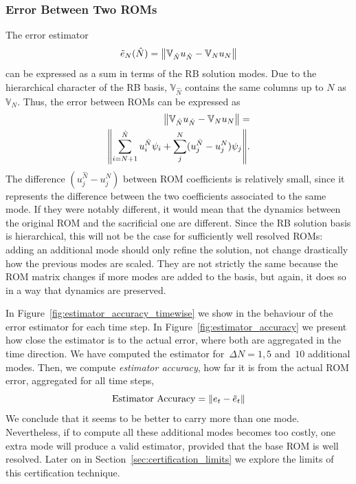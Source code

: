 \documentclass[../../thesis.tex]{subfiles}
\newcommand{\rbV}{\ensuremath{\mathbb{V}}}
\begin{document}
\subsubsection{Error Between Two ROMs}
The error estimator 
\begin{equation}
    \tilde{e}_{N}(\hat{N}) = \norm{\rbV_{\hat{N}} u_{\hat{N}} - \rbV_{N} u_{N}}
\end{equation}
can be expressed as a sum in terms of the RB solution modes.
Due to the hierarchical character of the RB basis, 
$\rbV_{\hat{N}}$ contains the same columns 
up to $N$ as $\rbV_{N}$.
Thus, the error between ROMs can be expressed as
\begin{equation}
    \begin{split}
        \norm{\rbV_{\hat{N}} u_{\hat{N}} - \rbV_{N} u_{N}} 
        = \\ 
        \norm{
        \sum_{i=N+1}^{\hat{N}} u^{\hat{N}}_{i} \psi_{i} 
        + 
        \sum_{j}^{N} (u^{\hat{N}}_{j} - u^{N}_{j}) \psi_j
        }.
    \end{split}
\end{equation}
The difference $(u^{\hat{N}}_{j} - u^{N}_{j})$ between ROM coefficients is relatively small, 
since it represents the difference between the two coefficients associated to the same mode.
If they were notably different, 
it would mean that the dynamics between the original ROM and the sacrificial one are different.
Since the RB solution basis is hierarchical, 
this will not be the case for sufficiently well resolved ROMs: 
adding an additional mode should only refine the solution, 
not change drastically how the previous modes are scaled.
They are not strictly the same because the ROM matrix changes if more modes are added to the basis,
but again, it does so in a way that dynamics are preserved.

In Figure~\ref{fig:estimator_accuracy_timewise} we show in the behaviour of the error estimator 
for each time step.
In Figure~\ref{fig:estimator_accuracy} 
we present how close the estimator is to the actual error,
where both are aggregated in the time direction.
We have computed the estimator for~\mbox{$\Delta N = 1, 5$} and~$10$ additional modes.
Then, we compute \textit{estimator accuracy}, how far it is from the actual ROM error,
aggregated for all time steps, 
\begin{equation}
    \text{Estimator Accuracy} = \norm{e_t - \tilde{e}_t} 
\end{equation}
We conclude that it seems to be better to carry more than one mode.
Nevertheless, if to compute all these additional modes becomes too costly,
one extra mode will produce a valid estimator, provided that the base ROM is well resolved.
Later on in Section~\ref{sec:certification_limits} we explore the limits of this certification technique.
\end{document}
